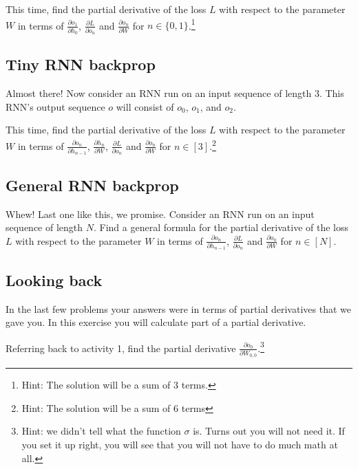 \documentclass{article}
\begin{document}
This time, find the partial derivative of the loss $L$ with respect to the parameter $W$ in terms of $\frac{\partial o_1}{\partial h_0}$, $\frac{\partial L}{\partial o_n}$ and $\frac{\partial o_n}{\partial W}$ for $n \in \{0,1\}$.\footnote{Hint: The solution will be a sum of 3 terms.}

\subsection{Tiny RNN backprop}
Almost there! Now consider an RNN run on an input sequence of length 3. This RNN's output sequence $o$ will consist of $o_0$, $o_1$, and $o_2$.

This time, find the partial derivative of the loss $L$ with respect to the parameter $W$ in terms of $\frac{\partial o_n}{\partial h_{n-1}}$, $\frac{\partial h_n}{\partial W}$, $\frac{\partial L}{\partial o_n}$ and $\frac{\partial o_n}{\partial W}$ for $n \in [3]$.\footnote{Hint: The solution will be a sum of 6 terms}

\subsection{General RNN backprop}
Whew! Last one like this, we promise. Consider an RNN run on an input sequence of length $N$. Find a general formula for the partial derivative of the loss $L$ with respect to the parameter $W$ in terms of $\frac{\partial o_n}{\partial h_{n-1}}$, $\frac{\partial L}{\partial o_n}$ and $\frac{\partial o_n}{\partial W}$ for $n \in [N]$.

\subsection{Looking back}
In the last few problems your answers were in terms of partial derivatives that we gave you. In this exercise you will calculate part of a partial derivative.

Referring back to activity 1, find the partial derivative $\frac{\partial o_{0}}{\partial W_{0,0}}$.\footnote{Hint: we didn't tell what the function $\sigma$ is. Turns out you will not need it. If you set it up right, you will see that you will not have to do much math at all.}
\end{document}
